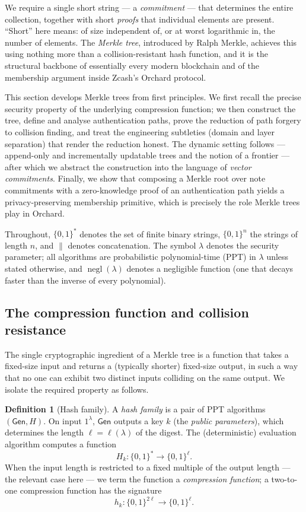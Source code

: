 \documentclass[11pt,a4paper]{article}
\theoremstyle{definition}
\newtheorem{definition}[theorem]{Definition}
\theoremstyle{remark}
\DeclareMathOperator{\negl}{negl}
\begin{document}
We require a single short string --- a \emph{commitment} --- that determines the entire collection, together with short \emph{proofs} that individual elements are present. ``Short'' here means: of size independent of, or at worst logarithmic in, the number of elements. The \emph{Merkle tree}, introduced by Ralph Merkle, achieves this using nothing more than a collision-resistant hash function, and it is the structural backbone of essentially every modern blockchain and of the membership argument inside Zcash's Orchard protocol.

This section develops Merkle trees from first principles. We first recall the precise security property of the underlying compression function; we then construct the tree, define and analyse authentication paths, prove the reduction of path forgery to collision finding, and treat the engineering subtleties (domain and layer separation) that render the reduction honest. The dynamic setting follows --- append-only and incrementally updatable trees and the notion of a frontier --- after which we abstract the construction into the language of \emph{vector commitments}. Finally, we show that composing a Merkle root over note commitments with a zero-knowledge proof of an authentication path yields a privacy-preserving membership primitive, which is precisely the role Merkle trees play in Orchard.

Throughout, \(\{0,1\}^*\) denotes the set of finite binary strings, \(\{0,1\}^n\) the strings of length \(n\), and \(\|\) denotes concatenation. The symbol \(\lambda\) denotes the security parameter; all algorithms are probabilistic polynomial-time (PPT) in \(\lambda\) unless stated otherwise, and \(\negl(\lambda)\) denotes a negligible function (one that decays faster than the inverse of every polynomial).

\subsection{The compression function and collision resistance}\label{merkle:sec-crh}

The single cryptographic ingredient of a Merkle tree is a function that takes a fixed-size input and returns a (typically shorter) fixed-size output, in such a way that no one can exhibit two distinct inputs colliding on the same output. We isolate the required property as follows.

\begin{definition}[Hash family]\label{merkle:def-hash-family}
A \emph{hash family} is a pair of PPT algorithms \((\mathsf{Gen}, H)\). On input \(1^\lambda\), \(\mathsf{Gen}\) outputs a key \(k\) (the \emph{public parameters}), which determines the length \(\ell = \ell(\lambda)\) of the digest. The (deterministic) evaluation algorithm computes a function
\[
H_k \colon \{0,1\}^* \longrightarrow \{0,1\}^{\ell}.
\]
When the input length is restricted to a fixed multiple of the output length --- the relevant case here --- we term the function a \emph{compression function}; a two-to-one compression function has the signature
\[
h_k \colon \{0,1\}^{2\ell} \longrightarrow \{0,1\}^{\ell}.
\]
\end{definition}
\end{document}
